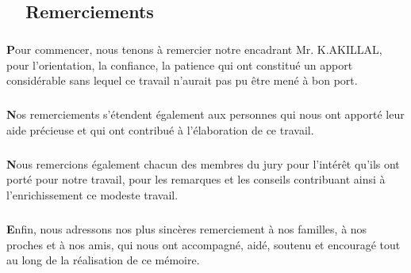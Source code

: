 \begin{titlepage}
\newpage
\pagestyle{fancy}      
\lhead{}  
\chead{}     
\rhead{}     
    
\renewcommand{\headrulewidth}{0.5pt}

\chapter*{\hrulefill ~~\textbf{Remerciements}~ \hrulefill}
\paragraph{}
\paragraph{}
\large

	  \textbf{P}our commencer, nous tenons \`a remercier notre encadrant Mr. K.AKILLAL, pour l'orientation, la confiance, la patience qui ont constitu\'e un apport consid\'erable sans lequel ce travail n'aurait pas pu \^etre men\'e \`a bon port. 
		
		\paragraph{}
			
		\textbf{N}os remerciements s'\'etendent \'egalement aux personnes qui nous ont apport\'e leur aide pr\'ecieuse et qui ont contribu\'e \`a l'\'elaboration de ce travail.
		
		\paragraph{}
		
		\textbf{N}ous remercions \'egalement chacun des membres du jury pour l'int\'er\^et qu'ils ont port\'e pour notre travail, pour les remarques et les conseils contribuant ainsi \`a l'enrichissement ce modeste travail.
		
		\paragraph{}
		\textbf{E}nfin, nous adressons nos plus sinc\`eres remerciement \`a nos familles, \`a nos proches et \`a nos amis, qui nous ont accompagn\'e, aid\'e, soutenu et encourag\'e tout au long de la r\'ealisation de ce m\'emoire. 
		
		\paragraph{}
		
		
		
		\paragraph{}
		


\thispagestyle{empty}		

\end{titlepage}	